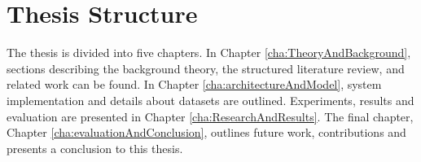 \section{Thesis Structure}
\label{sec:thesisStructure}
The thesis is divided into five chapters. In Chapter \ref{cha:TheoryAndBackground}, sections describing the background theory, the structured literature review, and related work can be found. In Chapter \ref{cha:architectureAndModel}, system implementation and details about datasets are outlined. Experiments, results and evaluation are presented in Chapter \ref{cha:ResearchAndResults}. The final chapter, Chapter \ref{cha:evaluationAndConclusion}, outlines future work, contributions and presents a conclusion to this thesis.
